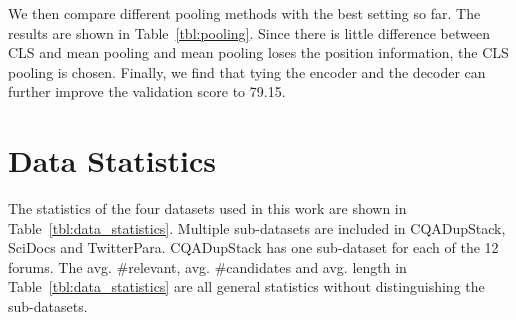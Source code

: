 \documentclass[11pt,a4paper]{article}
\begin{document}
\begin{table}[H]
\centering
{}
\caption{Results with different noise types}
\label{tbl:noise_type}
\end{table}




\begin{table}[H]
\centering
{}
\caption{Results with different noise ratio.}
\label{tbl:noise_ratio}
\end{table}

We then compare different pooling methods with the best setting so far. The results are shown in Table~\ref{tbl:pooling}. Since there is little difference between CLS and mean pooling and mean pooling loses the position information, the CLS pooling is chosen. Finally, we find that tying the encoder and the decoder can further improve the validation score to 79.15.

\begin{table}[H]
\centering
{}
\caption{Results with different pooling methods.}
\label{tbl:pooling}
\end{table}



\section{Data Statistics}
\label{sec:data_details}
The statistics of the four datasets used in this work are shown in Table~\ref{tbl:data_statistics}. Multiple sub-datasets are included in CQADupStack, SciDocs and TwitterPara. CQADupStack has one sub-dataset for each of the 12 forums. The avg. \#relevant, avg. \#candidates and avg. length in Table~\ref{tbl:data_statistics} are all general statistics without distinguishing the sub-datasets.
\end{document}
